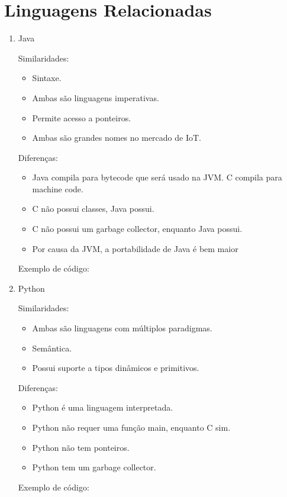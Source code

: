 \chapter{Linguagens Relacionadas}


\begin{enumerate}
    \item Java
  
    Similaridades: 
        \begin{itemize}
            \item Sintaxe.
            \item Ambas são linguagens imperativas.
            \item Permite acesso a ponteiros.
            \item Ambas são grandes nomes no mercado de IoT.
        \end{itemize}
    Diferenças:
    \begin{itemize}
        \item Java compila para bytecode que será usado na JVM. C compila para machine code.
        \item C não possui classes, Java possui.
        \item C não possui um garbage collector, enquanto Java possui.
        \item Por causa da JVM, a portabilidade de Java é bem maior
    \end{itemize}
    Exemplo de código: 
    


    \item Python
        
    Similaridades: 
        \begin{itemize}
            \item Ambas são linguagens com múltiplos paradigmas.
            \item Semântica.
            \item Possui suporte a tipos dinâmicos e primitivos.
        \end{itemize}
    Diferenças:
        \begin{itemize}
            \item Python é uma linguagem interpretada.
            \item Python não requer uma função main, enquanto C sim.
            \item Python não tem ponteiros.
            \item Python tem um garbage collector.
        \end{itemize}
    Exemplo de código: 
    
        

\end{enumerate}
